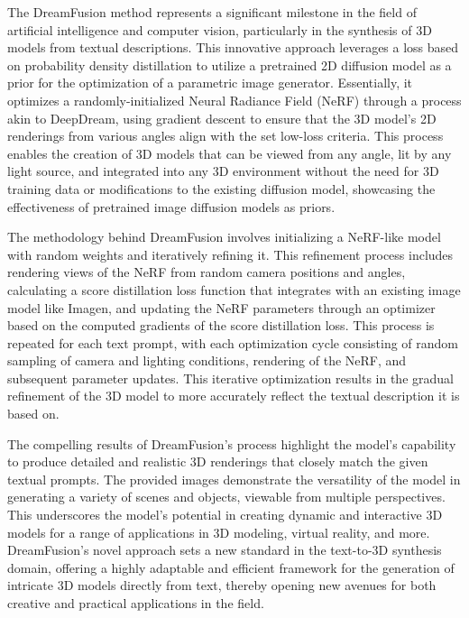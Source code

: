 The DreamFusion \cite*{poole2022dreamfusion} method represents a significant milestone in the field of artificial intelligence and computer vision, particularly in the synthesis of 3D models from textual descriptions. This innovative approach leverages a loss based on probability density distillation to utilize a pretrained 2D diffusion model as a prior for the optimization of a parametric image generator. Essentially, it optimizes a randomly-initialized Neural Radiance Field (NeRF) through a process akin to DeepDream, using gradient descent to ensure that the 3D model's 2D renderings from various angles align with the set low-loss criteria. This process enables the creation of 3D models that can be viewed from any angle, lit by any light source, and integrated into any 3D environment without the need for 3D training data or modifications to the existing diffusion model, showcasing the effectiveness of pretrained image diffusion models as priors.

The methodology behind DreamFusion involves initializing a NeRF-like model with random weights and iteratively refining it. This refinement process includes rendering views of the NeRF from random camera positions and angles, calculating a score distillation loss function that integrates with an existing image model like Imagen, and updating the NeRF parameters through an optimizer based on the computed gradients of the score distillation loss. This process is repeated for each text prompt, with each optimization cycle consisting of random sampling of camera and lighting conditions, rendering of the NeRF, and subsequent parameter updates. This iterative optimization results in the gradual refinement of the 3D model to more accurately reflect the textual description it is based on.

The compelling results of DreamFusion's process highlight the model's capability to produce detailed and realistic 3D renderings that closely match the given textual prompts. The provided images demonstrate the versatility of the model in generating a variety of scenes and objects, viewable from multiple perspectives. This underscores the model's potential in creating dynamic and interactive 3D models for a range of applications in 3D modeling, virtual reality, and more. DreamFusion's novel approach sets a new standard in the text-to-3D synthesis domain, offering a highly adaptable and efficient framework for the generation of intricate 3D models directly from text, thereby opening new avenues for both creative and practical applications in the field.






